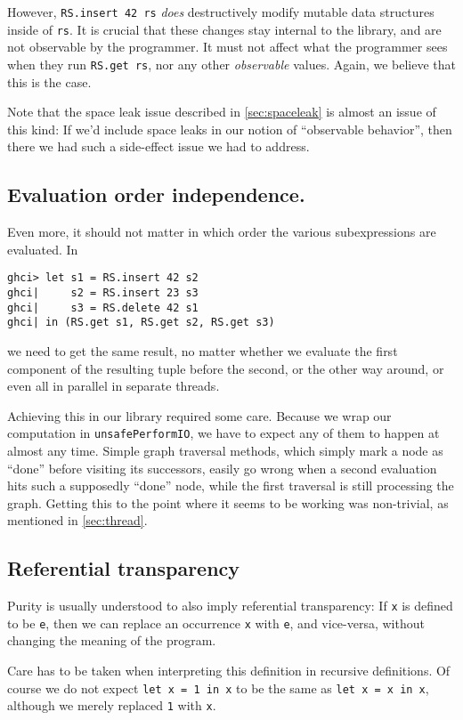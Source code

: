 \documentclass[manuscript,screen,acmsmall]{acmart}
\begin{document}
However, \verb|RS.insert 42 rs| \emph{does} destructively modify mutable data structures inside of \verb|rs|. It is crucial that these changes stay internal to the library, and are not observable by the programmer. It must not affect what the programmer sees when they run \verb|RS.get rs|, nor any other \emph{observable} values. Again, we believe that this is the case.

Note that the space leak issue described in \cref{sec:spaceleak} is almost an issue of this kind: If we’d include space leaks in our notion of “observable behavior”, then there we had such a side-effect issue we had to address.

\subsection{Evaluation order independence.}

Even more, it should not matter in which order the various subexpressions are evaluated. In
\begin{verbatim}
ghci> let s1 = RS.insert 42 s2
ghci|     s2 = RS.insert 23 s3
ghci|     s3 = RS.delete 42 s1
ghci| in (RS.get s1, RS.get s2, RS.get s3)
\end{verbatim}
we need to get the same result, no matter whether we evaluate the first component of the resulting tuple before the second, or the other way around, or even all in parallel in separate threads.

Achieving this in our library required some care. Because we wrap our computation in \verb|unsafePerformIO|, we have to expect any of them to happen at almost any time. Simple graph traversal methods, which simply mark a node as “done” before visiting its successors, easily go wrong when a second evaluation hits such a supposedly “done” node, while the first traversal is still processing the graph. Getting this to the point where it seems to be working was non-trivial, as mentioned in \cref{sec:thread}.

\subsection{Referential transparency}

Purity is usually understood to also imply referential transparency: If \verb|x| is defined to be \verb|e|, then we can replace an occurrence \verb|x| with \verb|e|, and vice-versa, without changing the meaning of the program.

Care has to be taken when interpreting this definition in recursive definitions. Of course we do not expect \verb|let x = 1 in x| to be the same as \verb|let x = x in x|, although we merely replaced \verb|1| with \verb|x|.
\end{document}
